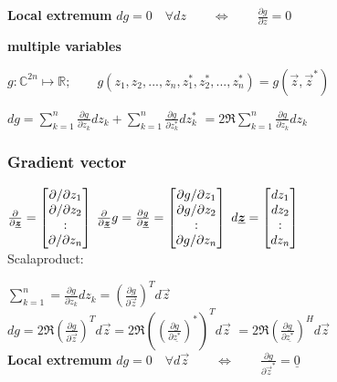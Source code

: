 \textbf{Local extremum}
$dg = 0 \quad \forall dz   \qquad \iff \qquad \frac{\partial g}{\partial z}=0$

\textbf{multiple variables}

$g:\mathbb{C}^{2n}\mapsto \mathbb{R}; \qquad g(z_1,z_2,...,z_n,z_1^*,z_2^*,...,z_n^*)=g(\vec{z},\vec{z}^*)$

$dg=\sum_{k=1}^{n} \frac{\partial g}{\partial z_k}dz_k+\sum_{k=1}^{n} \frac{\partial g}{\partial z_k^*}dz_k^* $
$=2\Re{\sum_{k=1}^{n}\frac{\partial g}{\partial z_k}dz_k}$



\subsubsection{Gradient vector}
$\frac{\partial}{\partial\underline{\boldsymbol {z}}}=\begin{bmatrix}\partial/\partial z_1 \\ \partial/\partial z_2 \\ : \\\partial/\partial z_n  \end{bmatrix} $ \qquad
$\frac{\partial}{\partial\underline{\boldsymbol {z}}}g=\frac{\partial g}{\partial\underline{\boldsymbol {z}}}=\begin{bmatrix}\partial g/\partial z_1 \\ \partial g/\partial z_2 \\ : \\\partial g/\partial z_n  \end{bmatrix} $
$d\underline{\boldsymbol {z}}=\begin{bmatrix}dz_1 \\ dz_2 \\ : \\ dz_n\end{bmatrix}$ \ \\

Scalaproduct:

$\sum\limits_{k=1}^n =\frac{\partial g}{\partial z_k}dz_k=\left(\frac{\partial g}{\partial \vec{z}}\right)^Td\vec{z}$\ \\

$dg=2\Re{\left(\frac{\partial g}{\partial \vec{z}}\right)^Td\vec{z}}=2\Re{\left(\left(\frac{\partial g}{\partial \underline{z^*}}\right)^*\right)^Td\vec{z}}$
$=2\Re{\left(\frac{\partial g}{\partial \underline{z^*}}\right)^Hd\vec{z}}$\ \\

\textbf{Local extremum}
$dg = 0 \quad \forall d\vec{z}   \qquad \iff \qquad \frac{\partial g}{\partial \vec{z}^*}=\underline{0}$


